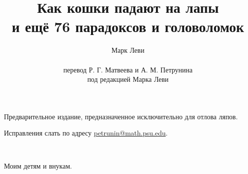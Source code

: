 \documentclass[twoside]{book}
\def\thetitle{Как кошки падают на лапы}
\begin{document}


\title{\thetitle\\
и ещё 76 парадоксов и головоломок}
\author{Марк Леви
\\
\\
перевод Р. Г. Матвеева и А. М. Петрунина
\\
под редакцией Марка Леви}
\date{}
\maketitle

\thispagestyle{empty}

Предварительное издание, предназначенное исключительно для отлова ляпов. 

Исправления слать по адресу 
\url{petrunin@math.psu.edu}.

\vfill

\pagebreak
\thispagestyle{empty}

\

\vfill

\begin{center}
{\Large
Моим детям и внукам.
}
\end{center}

\vfill

\

\newpage

{
\small
\cleardoublepage
{}
{}
\tableofcontents

}

\thispagestyle{empty}




\appendix




{

\sloppy

\nocite{*}%
\printbibliography[heading=bibintoc]
\fussy

}
\end{document}
